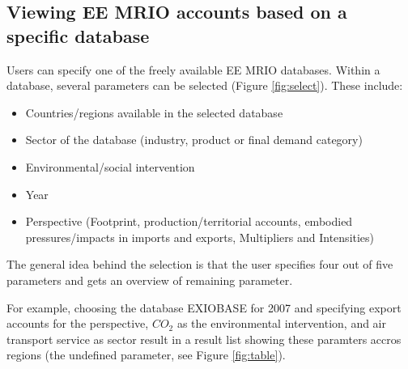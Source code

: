 \subsection{Viewing EE MRIO accounts based on a specific database}

Users can specify one of the freely available EE MRIO databases. 
Within a database, several parameters can be selected (Figure \ref{fig:select}). These include:

\begin{itemize}
    \item Countries/regions available in the selected database
    \item Sector of the database (industry, product or final demand category)
    \item Environmental/social intervention
    \item Year
    \item Perspective (Footprint, production/territorial accounts, embodied
      pressures/impacts in imports and exports, Multipliers and Intensities)
\end{itemize}


The general idea behind the selection is that the user specifies four out
of five parameters and gets an overview of remaining parameter.

For example, choosing the database EXIOBASE for 2007 and specifying export accounts for the perspective, $CO_2$ as the environmental intervention, and air transport service as sector result in a result list showing these paramters accros regions (the undefined parameter, see Figure \ref{fig:table}).